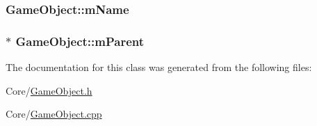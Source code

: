 \subsubsection[{\texorpdfstring{m\+Name}{mName}}]{ Game\+Object\+::m\+Name\hspace{0.3cm}{\ttfamily [private]}}\hypertarget{classGameObject_abf896795ad30b2e2a3087ca7dc54ccf0}{}\label{classGameObject_abf896795ad30b2e2a3087ca7dc54ccf0}
\subsubsection[{\texorpdfstring{m\+Parent}{mParent}}]{$\ast$ Game\+Object\+::m\+Parent\hspace{0.3cm}{\ttfamily [private]}}\hypertarget{classGameObject_a606e12729c1d5f4b2c72abb15d849afa}{}\label{classGameObject_a606e12729c1d5f4b2c72abb15d849afa}


The documentation for this class was generated from the following files\+:\begin{DoxyCompactItemize}
\item 
Core/\hyperlink{GameObject_8h}{Game\+Object.\+h}\item 
Core/\hyperlink{GameObject_8cpp}{Game\+Object.\+cpp}\end{DoxyCompactItemize}

